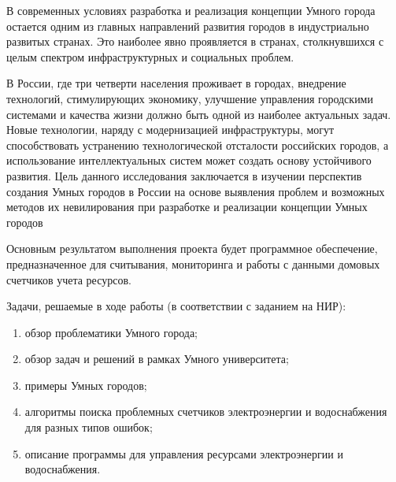 
В современных условиях разработка и реализация концепции Умного города остается одним из главных направлений развития городов в индустриально развитых странах. Это наиболее явно проявляется в странах, столкнувшихся с целым спектром инфраструктурных и социальных проблем.

В России, где три четверти населения проживает в городах, внедрение технологий, стимулирующих экономику, улучшение управления городскими системами и качества жизни должно быть одной из наиболее актуальных задач. Новые технологии, наряду с модернизацией инфраструктуры, могут способствовать устранению технологической отсталости российских городов, а использование интеллектуальных систем может создать основу устойчивого развития.\cite{Harrison}
Цель данного исследования заключается в изучении перспектив создания Умных городов в России на основе выявления проблем и возможных методов их невилирования при разработке и реализации концепции Умных городов

Основным результатом выполнения проекта будет программное обеспечение, предназначенное для считывания, мониторинга и работы с данными домовых счетчиков учета ресурсов.

Задачи, решаемые в ходе работы (в соответствии с заданием на НИР):
 \begin{enumerate}
 	\item обзор проблематики Умного города;
	\item обзор задач и решений в рамках Умного университета; 
	\item примеры Умных городов;
	\item алгоритмы поиска проблемных счетчиков электроэнергии и водоснабжения для разных типов ошибок;
	\item описание программы для управления ресурсами электроэнергии и водоснабжения.
\end{enumerate}

